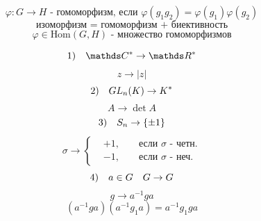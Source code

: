 \documentclass[12pt, fleqn]{article}
\begin{document}
\begin{Definition}
		\[\varphi : G \to H \text{ - гомоморфизм, если } \varphi(g_1 g_2) = \varphi(g_1) \varphi(g_2)\]
		\[\text{изоморфизм = гомоморфизм + биективность}\]
		\[\varphi \in \text{Hom}(G, H) \text{ - множество гомоморфизмов}\]
\end{Definition}

\begin{Examples}
	\[1)\q \CC^* \to \R^*\]
	\[z \to |z|\]
	\[2)\quad GL_n(K) \to K^*\]
	\[A \to \det A\]
	\[3)\quad S_n \to  \{\pm 1\}\]
	\[\sigma \to \left\{ \begin{align}
			&+1,& &\text{ если } \sigma \text{ - четн.}\\
			&-1,& &\text{ если } \sigma \text{ - неч.}
	\end{align}\]
	\[4)\quad a \in G \quad G \to G\]
	\[g \to a^{-1}g a\]
	\[(a^{-1}g a)(a^{-1}g_1a) = a^{-1}g_1 g a \]
\end{Examples}
\end{document}
